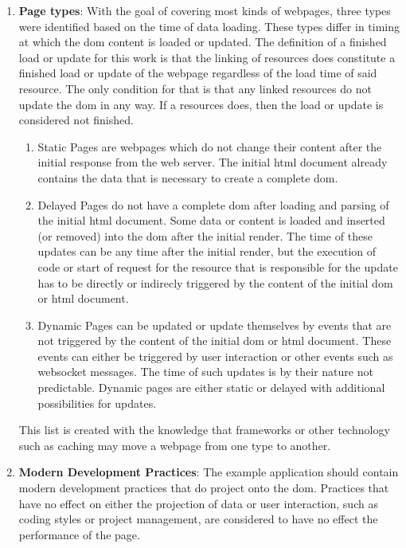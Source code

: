 \documentclass[a4paper, fontsize=11pt]{article}
\begin{document}
\begin{enumerate}
  \item \textbf{Page types}: With the goal of covering most kinds of webpages, three types were identified based on the time of data loading.\label{enum:pagetypes}
  These types differ in timing at which the \acrshort{dom} content is loaded or updated.
  The definition of a finished load or update for this work is that the linking of resources does constitute a finished load or update of the webpage regardless of the load time of said resource.
  The only condition for that is that any linked resources do not update the \acrshort{dom} in any way.
  If a resources does, then the load or update is considered not finished.
  \begin{enumerate}
    \item Static Pages are webpages which do not change their content after the initial response from the web server.
    The initial \acrshort{html} document already contains the data that is necessary to create a complete \acrshort{dom}.
    \item Delayed Pages do not have a complete \acrshort{dom} after loading and parsing of the initial \acrshort{html} document.
    Some data or content is loaded and inserted (or removed) into the \acrshort{dom} after the initial render.
    The time of these updates can be any time after the initial render, but the execution of code or start of request for the resource that is responsible for the update has to be directly or indirecly triggered by the content of the initial \acrshort{dom} or \acrshort{html} document.
    \item Dynamic Pages can be updated or update themselves by events that are not triggered by the content of the initial \acrshort{dom} or \acrshort{html} document.
    These events can either be triggered by user interaction or other events such as websocket messages.
    The time of such updates is by their nature not predictable.
    Dynamic pages are either static or delayed with additional possibilities for updates.
  \end{enumerate}
  This list is created with the knowledge that frameworks or other technology such as caching may move a webpage from one type to another.

  \item \textbf{Modern Development Practices}: The example application should contain modern development practices that do project onto the \acrshort{dom}.
  Practices that have no effect on either the projection of data or user interaction, such as coding styles or project management, are considered to have no effect the performance of the page.
  

\end{enumerate}
\end{document}
